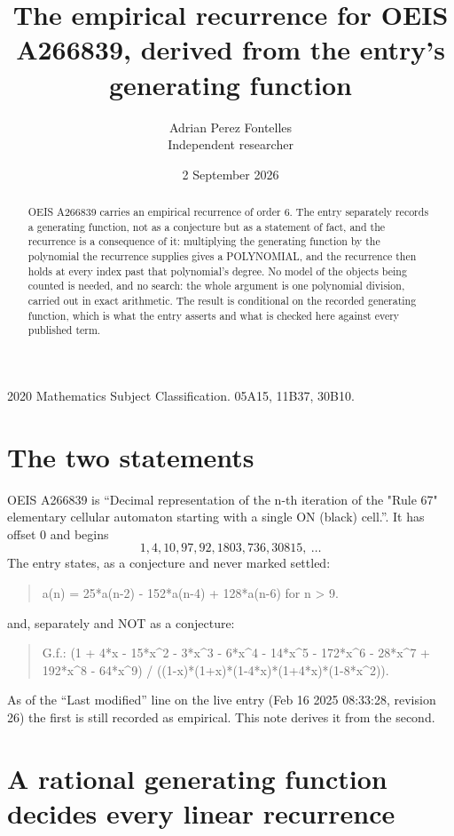 \documentclass[11pt,a4paper]{article}
\title{The empirical recurrence for OEIS A266839, derived from the entry's generating function}
\author{Adrian Perez Fontelles\\ \small Independent researcher}
\date{2 September 2026}
\theoremstyle{plain}
\theoremstyle{definition}
\begin{document}
\maketitle

\begin{abstract}
OEIS A266839 carries an empirical recurrence of order $6$. The entry separately records a
generating function, not as a conjecture but as a statement of fact, and the recurrence is a
consequence of it: multiplying the generating function by the polynomial the recurrence
supplies gives a POLYNOMIAL, and the recurrence then holds at every index past that
polynomial's degree. No model of the objects being counted is needed, and no search: the
whole argument is one polynomial division, carried out in exact arithmetic. The result is
conditional on the recorded generating function, which is what the entry asserts and what is
checked here against every published term.
\end{abstract}

\noindent\small 2020 Mathematics Subject Classification. 05A15, 11B37, 30B10.\normalsize

\section{The two statements}

OEIS A266839 is ``Decimal representation of the n-th iteration of the "Rule 67" elementary cellular automaton starting with a single ON (black) cell.''. It has offset $0$ and begins
\[
1, 4, 10, 97, 92, 1803, 736, 30815,\ \dots
\]
The entry states, as a conjecture and never marked settled:
\begin{quote}
a(n) = 25*a(n-2) - 152*a(n-4) + 128*a(n-6) for n > 9.
\end{quote}
and, separately and NOT as a conjecture:
\begin{quote}
G.f.: (1 + 4*x - 15*x\^{}2 - 3*x\^{}3 - 6*x\^{}4 - 14*x\^{}5 - 172*x\^{}6 - 28*x\^{}7 + 192*x\^{}8 - 64*x\^{}9) / ((1-x)*(1+x)*(1-4*x)*(1+4*x)*(1-8*x\^{}2)).
\end{quote}
As of the ``Last modified'' line on the live entry (Feb 16 2025 08:33:28, revision 26) the first is still
recorded as empirical. This note derives it from the second.

\section{A rational generating function decides every linear recurrence}
\end{document}
